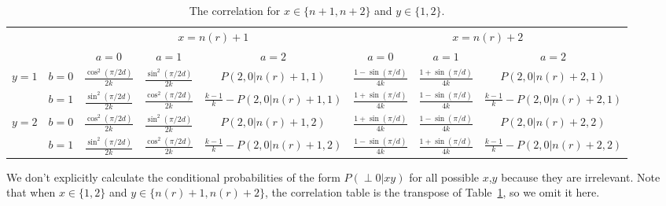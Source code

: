 \documentclass[11pt,letterpaper]{article}
\newcommand{\1}{\mathbb{1}}
\newcommand{\nr}{n(r)}
\newcommand{\pr}[2]{P(#1|#2)}
\theoremstyle{definition}
\begin{document}
\begin{table}[H]
\begin{center}
\begin{tabular}{|c|c||c|c|c|c|c|c|}
\hline
\multicolumn{2}{|c|}{} &
\multicolumn{3}{|c|}{$x=\nr+1$}&
\multicolumn{3}{|c|}{$x=\nr+2$} \\
\cline{3-8}
\multicolumn{2}{|c|}{} &
$a = 0$ & $a=1$ & $a=2$ &
$a = 0$ & $a=1$ & $a=2$\\
\hline
\hline
\multirow{2}{*}{$y = 1$} & $b=0$ & $\frac{\cos^2(\pi/2d)}{2k}$ & $\frac{\sin^2(\pi/2d)}{2k}$ & \small $\pr{2,0}{\nr+1,1}$ 
& $\frac{1-\sin(\pi/d)}{4k}$ & $\frac{1+\sin(\pi/d)}{4k}$ & \small  $\pr{2,0}{\nr+2,1}$ \\
\cline{2-8}
&$b=1$ & $\frac{\sin^2(\pi/2d)}{2k}$ & $\frac{\cos^2(\pi/2d)}{2k}$ & $\frac{k-1}{k}-\pr{2,0}{\nr+1,1}$ 
&  $\frac{1+\sin(\pi/d)}{4k}$ & $\frac{1-\sin(\pi/d)}{4k}$ & \small $\frac{k-1}{k} - \pr{2,0}{\nr+2,1}$  \\
\hline
\multirow{2}{*}{$y = 2$} & $b=0$ & $\frac{\cos^2(\pi/2d)}{2k}$ & $\frac{\sin^2(\pi/2d)}{2k}$ & \small $\pr{2,0}{\nr+1,2}$ & 
$ \frac{1+\sin(\pi/d)}{4k}$ & $ \frac{1-\sin(\pi/d)}{4k}$ & \small $\pr{2, 0}{\nr+2,2}$  \\
\cline{2-8}
&$b=1$ & $\frac{\sin^2(\pi/2d)}{2k}$ & $\frac{\cos^2(\pi/2d)}{2k}$ & \small $\frac{k-1}{k}-\pr{2,0}{\nr+1,2}$ &  
$ \frac{1-\sin(\pi/d)}{4k}$ & $ \frac{1+\sin(\pi/d)}{4k}$ & \small $\frac{k-1}{k}- \pr{2, 0}{\nr+2,2}$ \\
\hline
\end{tabular}
\end{center}
\caption{The correlation for $x \in \{n+1, n+2\}$ and $y \in \{1,2\}$.}
\label{tb:chsh}
\end{table}
We don't explicitly calculate the conditional probabilities of the form $\pr{\perp 0}{xy}$ for all possible $x$,$y$ 
because they are irrelevant.
Note that when $x \in \{1,2\}$ and $y \in \{\nr+1, \nr+2\}$, the correlation table is 
the transpose of Table~\ref{tb:chsh}, so we omit it here.
\end{document}
